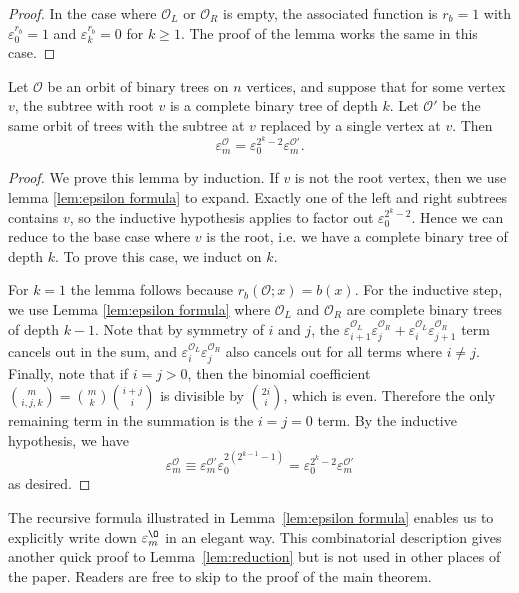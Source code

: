 \begin{proof}
    In the case where $\mathcal{O}_L$ or $\mathcal{O}_R$ is empty, the associated function is $r_b=1$ with $\varepsilon^{r_b}_0=1$ and $\varepsilon^{r_b}_k=0$ for $k\geq 1$. The proof of the lemma works the same in this case.
\end{proof}

\begin{lemma}
    \label{lem:reduction}
    Let $\mathcal{O}$ be an orbit of binary trees on $n$ vertices, and suppose that for some vertex $v$, the subtree with root $v$ is a complete binary tree of depth $k$. Let $\mathcal{O}'$ be the same orbit of trees with the subtree at $v$ replaced by a single vertex at $v$. Then \[\varepsilon_m^{\mathcal{O}}=\varepsilon_0^{2^k-2}\varepsilon_m^{\mathcal{O}'}.\]
\end{lemma}

\begin{proof}
    We prove this lemma by induction. If $v$ is not the root vertex, then we use lemma \ref{lem:epsilon formula} to expand. Exactly one of the left and right subtrees contains $v$, so the inductive hypothesis applies to factor out $\varepsilon_0^{2^k-2}$. Hence we can reduce to the base case where $v$ is the root, i.e. we have a complete binary tree of depth $k$. To prove this case, we induct on $k$.
    
    For $k=1$ the lemma follows because $r_b(\mathcal{O}; x)=b(x)$. For the inductive step, we use Lemma \ref{lem:epsilon formula} where $\mathcal{O}_L$ and $\mathcal{O}_R$ are complete binary trees of depth $k-1$. Note that by symmetry of $i$ and $j$, the $\varepsilon^{\mathcal{O}_L}_{i+1}\varepsilon^{\mathcal{O}_R}_j+\varepsilon^{\mathcal{O}_L}_{i}\varepsilon^{\mathcal{O}_R}_{j+1}$ term cancels out in the sum, and $\varepsilon^{\mathcal{O}_L}_{i}\varepsilon^{\mathcal{O}_R}_j$ also cancels out for all terms where $i\neq j$. Finally, note that if $i=j > 0$, then the binomial coefficient $\binom{m}{i, j, k}=\binom{m}{k}\binom{i+j}{i}$ is divisible by $\binom{2i}{i}$, which is even. Therefore the only remaining term in the summation is the $i=j=0$ term. By the inductive hypothesis, we have
    \[\varepsilon^{\mathcal{O}}_m\equiv \varepsilon_m^{\mathcal{O'}}\varepsilon_0^{2(2^{k-1}-1)}=\varepsilon_0^{2^k-2}\varepsilon_m^{\mathcal{O}'}\]
    as desired.
\end{proof}

The recursive formula illustrated in Lemma~\ref{lem:epsilon formula} enables us to explicitly write down $\varepsilon_m^{\O}$ in an elegant way. This combinatorial description gives another quick proof to Lemma~\ref{lem:reduction} but is not used in other places of the paper. Readers are free to skip to the proof of the main theorem.

